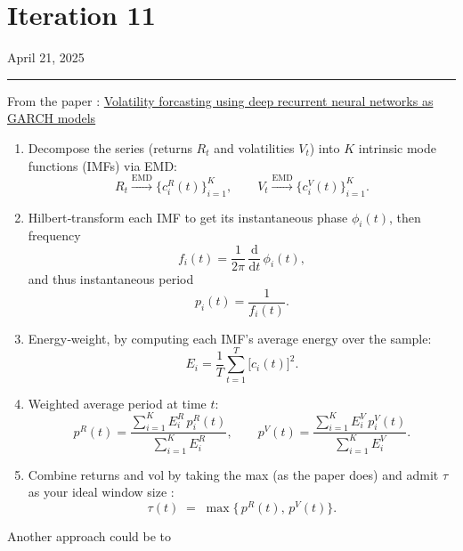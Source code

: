 \documentclass[letterpaper,11pt]{article}
\begin{document}
\newpage
\section*{Iteration 11}
\begin{flushright}
April 21, 2025
\end{flushright}
\hrule
\vspace{0.2in}

From the paper : \href{https://link.springer.com/content/pdf/10.1007/s00180-023-01349-1.pdf}{Volatility forcasting using deep recurrent neural networks as GARCH models}\\


\begin{enumerate}
  \item Decompose the series (returns $R_t$ and volatilities $V_t$) into $K$ intrinsic mode functions (IMFs) via EMD:
  \[
    R_t \xrightarrow{\mathrm{EMD}} \bigl\{c_i^R(t)\bigr\}_{i=1}^K,
    \qquad
    V_t \xrightarrow{\mathrm{EMD}} \bigl\{c_i^V(t)\bigr\}_{i=1}^K.
  \]

  \item Hilbert‐transform each IMF to get its instantaneous phase $\phi_i(t)$, then frequency
  \[
    f_i(t)
    = \frac{1}{2\pi}\,\frac{\mathrm{d}}{\mathrm{d}t}\,\phi_i(t),
  \]
  and thus instantaneous period
  \[
    p_i(t) = \frac{1}{f_i(t)}.
  \]

  \item Energy‐weight, by computing each IMF’s average energy over the sample:
  \[
    E_i = \frac{1}{T} \sum_{t=1}^{T} \bigl[c_i(t)\bigr]^2.
  \]

  \item Weighted average period at time $t$:
  \[
    p^R(t)
    = \frac{\sum_{i=1}^K E_i^R\,p_i^R(t)}{\sum_{i=1}^K E_i^R},
    \qquad
    p^V(t)
    = \frac{\sum_{i=1}^K E_i^V\,p_i^V(t)}{\sum_{i=1}^K E_i^V}.
  \]

  \item Combine returns and vol by taking the max (as the paper does) and admit $\tau $ as your ideal window size :
  \[
    \tau(t) \;=\; \max\bigl\{\,p^R(t),\,p^V(t)\bigr\}.
  \]
\end{enumerate}

Another approach could be to 
\bigskip
\end{document}
